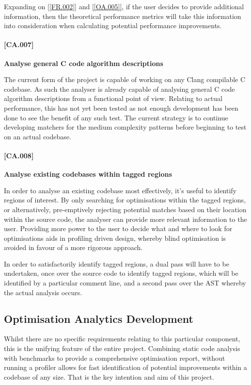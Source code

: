 Expanding on \ref{[FR.002]} and \ref{[OA.005]}, if the user decides to provide additional information, then the theoretical performance metrics will take this information into consideration when calculating potential performance improvements.

\paragraph{[CA.007]}
\textbf{Analyse general C code algorithm descriptions}

The current form of the project is capable of working on any Clang compilable C codebase. As such the analyser is already capable of analysing general C code algorithm descriptions from a functional point of view. Relating to actual performance, this has not yet been tested as not enough development has been done to see the benefit of any such test. The current strategy is to continue developing matchers for the medium complexity patterns before beginning to test on an actual codebase.

\paragraph{[CA.008]}
\textbf{Analyse existing codebases within tagged regions}

In order to analyse an existing codebase most effectively, it's useful to identify regions of interest. By only searching for optimisations within the tagged regions, or alternatively, pre-emptively rejecting potential matches based on their location within the source code, the analyser can provide more relevant information to the user. Providing more power to the user to decide what and where to look for optimisations aids in profiling driven design, whereby blind optimisation is avoided in favour of a more rigorous approach. 

In order to satisfactorily identify tagged regions, a dual pass will have to be undertaken, once over the source code to identify tagged regions, which will be identified by a particular comment line, and a second pass over the AST whereby the actual analysis occurs.


\subsection{Optimisation Analytics Development}

Whilst there are no specific requirements relating to this particular component, this is the unifying feature of the entire project. Combining static code analysis with benchmarks to provide a comprehensive optimisation report, without running a profiler allows for fast identification of potential improvements within a codebase of any size. That is the key intention and aim of this project.

